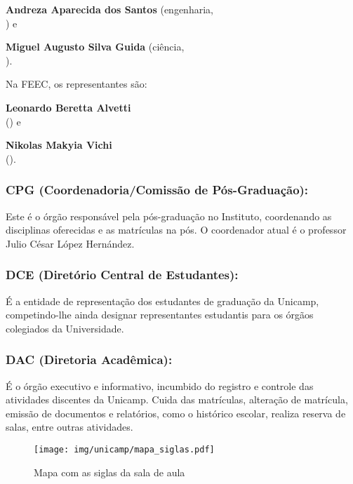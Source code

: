 \begin{compactitemize}
\item \textbf{Andreza Aparecida dos Santos} (engenharia,
  \\ ) e
\item \textbf{Miguel Augusto Silva Guida} (ciência,
  \\ ).
\end{compactitemize}

Na FEEC, os representantes são:

\begin{compactitemize}
\item \textbf{Leonardo Beretta Alvetti}
  \\ () e
\item \textbf{Nikolas Makyia Vichi}
  \\ ().
\end{compactitemize}

\subsubsection{CPG (Coordenadoria/Comissão de Pós-Graduação):} Este é o órgão
responsável pela pós-graduação no Instituto, coordenando as disciplinas
oferecidas e as matrículas na pós. O coordenador atual é o professor Julio
César López Hernández.

\subsubsection{DCE (Diretório Central de Estudantes):} É a entidade de
representação dos estudantes de graduação da Unicamp, competindo-lhe ainda
designar representantes estudantis para os órgãos colegiados da Universidade.

\subsubsection{DAC (Diretoria Acadêmica):} É o órgão executivo e informativo,
incumbido do registro e controle das atividades discentes da Unicamp. Cuida das
matrículas, alteração de matrícula, emissão de documentos e relatórios, como o
histórico escolar, realiza reserva de salas, entre outras atividades.

\begin{figure*}[hb!]  \centering
  \texttt{[image: img/unicamp/mapa\_siglas.pdf]}
  \caption{Mapa com as siglas da sala de aula}
  \label{fig:mapa_siglas}
\end{figure*}

